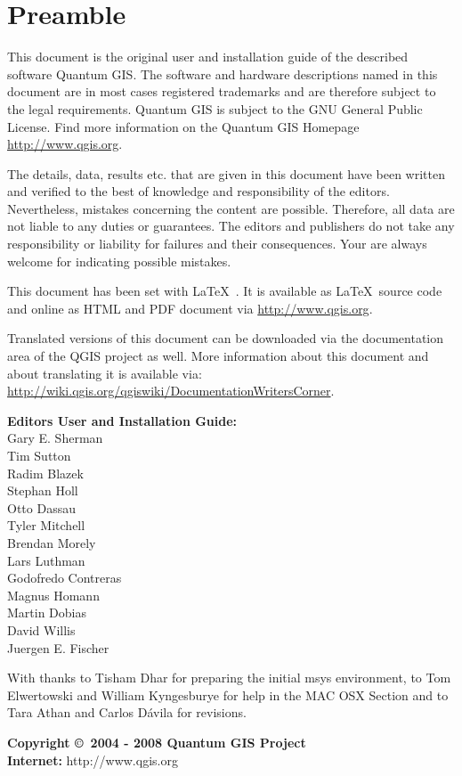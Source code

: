 \thispagestyle{empty}
\section*{Preamble}

\vspace{1cm}

This document is the original user and installation guide of the described 
software Quantum GIS. The software and hardware descriptions named in this 
document are in most cases registered trademarks and are therefore subject 
to the legal requirements. Quantum GIS is subject to the GNU General Public 
License. Find more information on the Quantum GIS Homepage \url{http://www.qgis.org}.

The details, data, results etc. that are given in this document have been 
written and verified to the best of knowledge and responsibility of the 
editors. Nevertheless, mistakes concerning the content are possible. 
Therefore, all data are not liable to any duties or guarantees. The editors 
and publishers do not take any responsibility or liability for failures and 
their consequences. Your are always welcome for indicating possible mistakes.

This document has been set with \LaTeX~. It is available as \LaTeX~source 
code and online as HTML and PDF document via \url{http://www.qgis.org}.

Translated versions of this document can be downloaded via the documentation 
area of the QGIS project as well. More information about this document and 
about translating it is available via: \\
\url{http://wiki.qgis.org/qgiswiki/DocumentationWritersCorner}. 

\begin{flushleft}
\textbf{Editors User and Installation Guide:} 
\\ Gary E. Sherman 
\\ Tim Sutton 
\\ Radim Blazek 
\\ Stephan Holl 
\\ Otto Dassau 
\\ Tyler Mitchell 
\\ Brendan Morely 
\\ Lars Luthman 
\\ Godofredo Contreras 
\\ Magnus Homann
\\ Martin Dobias
\\ David Willis
\\ Juergen E. Fischer

With thanks to Tisham Dhar for preparing the initial msys environment, to Tom 
Elwertowski and William Kyngesburye for help in the MAC OSX Section and to Tara 
Athan and Carlos D\'{a}vila for revisions.

\textbf{Copyright \copyright~2004 - 2008 Quantum GIS Project} \\
\textbf{Internet:} http://www.qgis.org
\end{flushleft}

